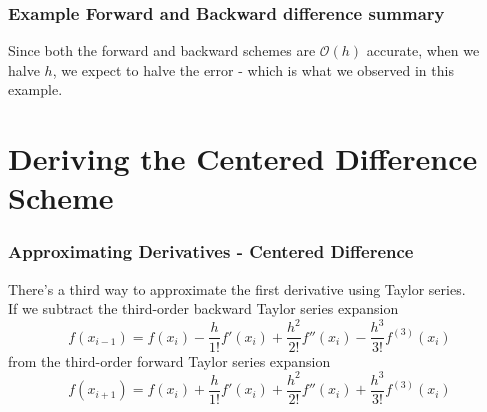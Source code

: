 \documentclass{if-beamer}
\begin{document}


\begin{frame}
	\frametitle{Example Forward and Backward difference summary}
	Since both the forward and backward schemes are $\mathcal{O}(h)$ accurate, when we halve $h$, we expect to halve the error - which is what we observed in this example. 
\end{frame}

\section{Deriving the Centered Difference Scheme}
\begin{frame}
	\frametitle{Approximating Derivatives - Centered Difference}
	There's a third way to approximate the first derivative using Taylor series. 
	\\\vspace{5pt}
	If we subtract the third-order backward Taylor series expansion 
	$$f(x_{i-1}) = f(x_i) -\frac{h}{1!}f'(x_i) + \frac{h^2}{2!}f''(x_i)-\frac{h^3}{3!}f^{(3)}(x_i)$$
	from the third-order forward Taylor series expansion
	$$f(x_{i+1}) = f(x_i) +\frac{h}{1!}f'(x_i) + \frac{h^2}{2!}f''(x_i)+ \frac{h^3}{3!}f^{(3)}(x_i)$$
\end{frame}
\end{document}
